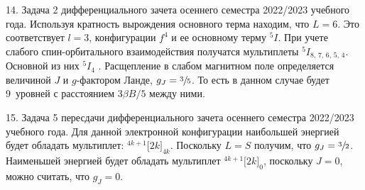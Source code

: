 14. Задача 2 дифференциального зачета осеннего семестра 2022/2023 учебного года. Используя кратность вырождения основного терма находим, что $L=6$. Это соответствует $l=3$, конфигурации $f^4$ и ее основному терму $^5I$. При учете слабого спин-орбитального взаимодействия получатся мультиплеты $^5I_{8,\,7,\,6,\,5,\,4}$. Основной из них $^5I_4$ . Расщепление в слабом магнитном поле определяется величиной $J$ и $g$-фактором Ланде, $g_J=\sfrac35$. То есть в данном случае будет 9~уровней с расстоянием $3 \beta B/5$ между ними.\par
15. Задача 5 пересдачи дифференциального зачета осеннего семестра 2022/2023 учебного года. Для данной электронной конфигурации наибольшей энергией будет обладать мультиплет: $^{4k+1}\Big[ 2k \Big] _{4k}$. Поскольку $L=S$ получим, что $g_{J} = \sfrac{3}{2}$. Наименьшей энергией будет обладать мультиплет $^{4k+1}\Big[ 2k \Big] _{0}$, поскольку $J=0$, можно считать, что $g_{J}=0$.\par
\newpage

